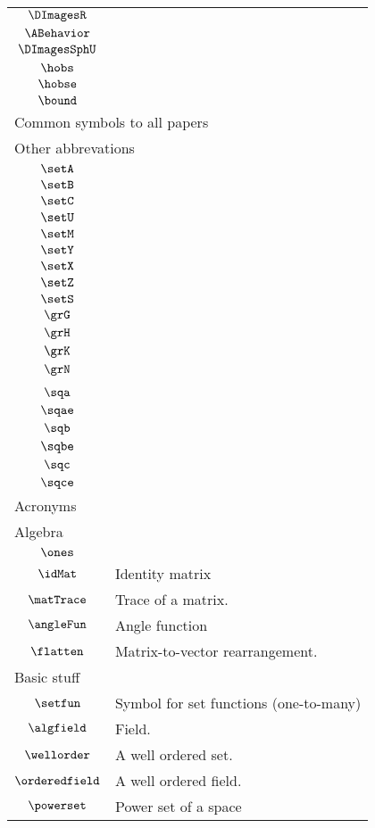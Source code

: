 \begin{longtable}{cl}
 $\DImagesR$ & \\ 
 $\ABehavior$ & \\ 
 $\DImagesSphU$ & \\ 
 $\hobs$ & \\ 
 $\hobse$ & \\ 
 $\bound$ & \\ 
 \multicolumn{2}{l}{Common symbols to all papers}\\ 
 \hline
\hline
\multicolumn{2}{l}{Other abbrevations}\\ 
 \hline
$\setA$ & \\ 
 $\setB$ & \\ 
 $\setC$ & \\ 
 $\setU$ & \\ 
 $\setM$ & \\ 
 $\setY$ & \\ 
 $\setX$ & \\ 
 $\setZ$ & \\ 
 $\setS$ & \\ 
 $\grG$ & \\ 
 $\grH$ & \\ 
 $\grK$ & \\ 
 $\grN$ & \\ 
 \multicolumn{2}{l}{}\\ 
 \hline
$\sqa$ & \\ 
 $\sqae$ & \\ 
 $\sqb$ & \\ 
 $\sqbe$ & \\ 
 $\sqc$ & \\ 
 $\sqce$ & \\ 
 \multicolumn{2}{l}{Acronyms}\\ 
 \hline
\multicolumn{2}{l}{Algebra}\\ 
 \hline
$\ones$ & \\ 
 $\idMat$ &  Identity matrix\\ 
 $\matTrace$ &  Trace of a matrix.\\ 
 $\angleFun$ &  Angle function\\ 
 $\flatten$ &  Matrix-to-vector rearrangement.\\ 
 \multicolumn{2}{l}{Basic stuff}\\ 
 \hline
$\setfun$ &  Symbol for set functions (one-to-many)\\ 
 $\algfield$ &  Field.\\ 
 $\wellorder$ &  A well ordered set.\\ 
 $\orderedfield$ &  A well ordered field.\\ 
 $\powerset$ &  Power set of a space\\ 

\end{longtable}
